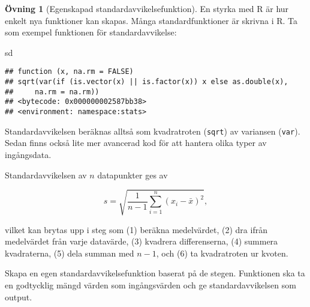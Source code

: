 \documentclass[
]{book}
\newenvironment{Shaded}{\begin{snugshade}}{\end{snugshade}}
\newcommand{\NormalTok}[1]{#1}
\theoremstyle{definition}
\theoremstyle{definition}
\theoremstyle{definition}
\newtheorem{exercise}{Övning}[chapter]
\theoremstyle{definition}
\theoremstyle{remark}
\begin{document}
\begin{exercise}[Egenskapad standardavvikelsefunktion]
En styrka med R är hur enkelt nya funktioner kan skapas. Många standardfunktioner är skrivna i R. Ta som exempel funktionen för standardavvikelse:

\begin{Shaded}
\begin{Highlighting}[]
\NormalTok{sd}
\end{Highlighting}
\end{Shaded}

\begin{verbatim}
## function (x, na.rm = FALSE) 
## sqrt(var(if (is.vector(x) || is.factor(x)) x else as.double(x), 
##     na.rm = na.rm))
## <bytecode: 0x000000002587bb38>
## <environment: namespace:stats>
\end{verbatim}

Standardavvikelsen beräknas alltså som kvadratroten (\texttt{sqrt}) av variansen (\texttt{var}). Sedan finns också lite mer avancerad kod för att hantera olika typer av ingångsdata.

Standardavvikelsen av \(n\) datapunkter ges av

\[s = \sqrt{\frac{1}{n-1}\sum_{i=1}^n (x_i - \bar x)^2},\]

vilket kan brytas upp i steg som (1) beräkna medelvärdet, (2) dra ifrån medelvärdet från varje datavärde, (3) kvadrera differenserna, (4) summera kvadraterna, (5) dela summan med \(n-1\), och (6) ta kvadratroten ur kvoten.

Skapa en egen standardavvikelsefunktion baserat på de stegen. Funktionen ska ta en godtycklig mängd värden som ingångsvärden och ge standardavvikelsen som output.
\end{exercise}
\end{document}
